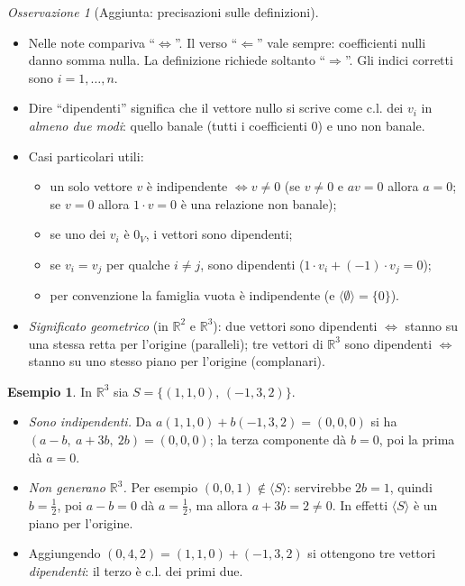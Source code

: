 \documentclass[11pt,a4paper]{article}
\newcommand{\RR}{\mathbb{R}}
\theoremstyle{plain}
\theoremstyle{definition}
\newtheorem{esempio}[prop]{Esempio}
\theoremstyle{remark}
\newtheorem{oss}[prop]{Osservazione}
\begin{document}
\begin{oss}[Aggiunta: precisazioni sulle definizioni]
\begin{itemize}[leftmargin=*]
  \item Nelle note compariva ``$\iff$''.
  Il verso ``$\Leftarrow$'' vale sempre: coefficienti nulli danno
  somma nulla. La definizione richiede soltanto ``$\Rightarrow$''.
  Gli indici corretti sono $i=1,\dots,n$.
  \item Dire ``dipendenti'' significa che il vettore nullo si scrive come c.l. dei $v_i$ in \emph{almeno due modi}: quello banale (tutti i coefficienti $0$) e uno non banale.
  \item Casi particolari utili:
  \begin{itemize}
    \item un solo vettore $v$ è indipendente $\iff v\neq0$ (se $v\ne0$ e $av=0$ allora $a=0$; se $v=0$ allora $1\cdot v=0$ è una relazione non banale);
    \item se uno dei $v_i$ è $0_V$, i vettori sono dipendenti;
    \item se $v_i=v_j$ per qualche $i\ne j$, sono dipendenti ($1\cdot v_i+(-1)\cdot v_j=0$);
    \item per convenzione la famiglia vuota è indipendente (e $\langle\emptyset\rangle=\{0\}$).
  \end{itemize}
  \item \emph{Significato geometrico} (in $\RR^2$ e $\RR^3$): due vettori sono dipendenti $\iff$ stanno su una stessa retta per l'origine (paralleli); tre vettori di $\RR^3$ sono dipendenti $\iff$ stanno su uno stesso piano per l'origine (complanari).
\end{itemize}
\end{oss}

\begin{esempio}
In $\RR^3$ sia $S=\{(1,1,0),\,(-1,3,2)\}$.
\begin{itemize}[leftmargin=*]
  \item \emph{Sono indipendenti.} Da $a(1,1,0)+b(-1,3,2)=(0,0,0)$ si ha $(a-b,\ a+3b,\ 2b)=(0,0,0)$; la terza componente dà $b=0$, poi la prima dà $a=0$.
  \item \emph{Non generano $\RR^3$.} Per esempio $(0,0,1)\notin\langle S\rangle$: servirebbe $2b=1$, quindi $b=\frac12$, poi $a-b=0$ dà $a=\frac12$, ma allora $a+3b=2\ne0$. In effetti $\langle S\rangle$ è un piano per l'origine.
  \item Aggiungendo $(0,4,2)=(1,1,0)+(-1,3,2)$ si ottengono tre vettori \emph{dipendenti}: il terzo è c.l. dei primi due.
\end{itemize}
\end{esempio}
\end{document}
